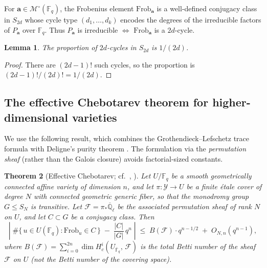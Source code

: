 \documentclass[11pt, a4paper]{article}
\newtheorem{theorem}{Theorem}[section]
\newtheorem{lemma}[theorem]{Lemma}
\theoremstyle{definition}
\theoremstyle{remark}
\newcommand{\Fq}{\mathbb{F}_q}
\newcommand{\Fqbar}{\overline{\mathbb{F}}_q}
\newcommand{\Frob}{\mathrm{Frob}}
\begin{document}
For $\mathbf{a} \in \mathcal{M}^\circ(\Fq)$,
the Frobenius element $\Frob_\mathbf{a}$ is a well-defined
conjugacy class in $S_{2d}$ whose cycle type
$(d_1, \ldots, d_k)$ encodes the degrees of the irreducible
factors of $P_\mathbf{a}$ over $\Fq$.
Thus $P_\mathbf{a}$ is irreducible $\Leftrightarrow$
$\Frob_\mathbf{a}$ is a $2d$-cycle.

\begin{lemma}\label{lem:cycle_fraction}
The proportion of $2d$-cycles in $S_{2d}$ is $1/(2d)$.
\end{lemma}

\begin{proof}
There are $(2d-1)!$ such cycles, so the proportion is
$(2d-1)!/(2d)! = 1/(2d)$.
\end{proof}

\subsection{The effective Chebotarev theorem
for higher-dimensional varieties}

We use the following result, which combines the
Grothendieck--Lefschetz trace formula with Deligne's purity
theorem \cite{deligne1980}.
The formulation via the \emph{permutation sheaf} (rather than
the Galois closure) avoids factorial-sized constants.

\begin{theorem}[Effective Chebotarev;
cf.\ {\cite[Thm.~9.2.6]{katz1988}},
{\cite[\S9.7]{FJ2008}}]
\label{thm:chebotarev}
Let $U/\Fq$ be a smooth geometrically connected affine variety of
dimension $n$, and let $\pi : \mathcal{Y} \to U$ be a finite
\'etale cover of degree $N$ with connected geometric generic fiber,
so that the monodromy group $G \le S_N$ is transitive.
Let $\mathcal{F} = \pi_*\overline{\mathbb{Q}}_\ell$ be the
associated permutation sheaf of rank $N$ on $U$, and let
$C \subset G$ be a conjugacy class.
Then
\begin{equation}\label{eq:cheb}
    \left|\;
    \#\bigl\{\, u \in U(\Fq) : \Frob_u \in C \,\bigr\}
    \;-\; \frac{|C|}{|G|}\, q^n
    \;\right|
    \;\le\;
    B(\mathcal{F}) \cdot q^{n - 1/2}
    \;+\; O_{N,n}(q^{n-1}),
\end{equation}
where $B(\mathcal{F}) = \sum_{i=0}^{2n}
\dim H^i_c(U_{\Fqbar},\, \mathcal{F})$
is the total Betti number of the \emph{sheaf} $\mathcal{F}$
on $U$ (not the Betti number of the covering space).
\end{theorem}
\end{document}
